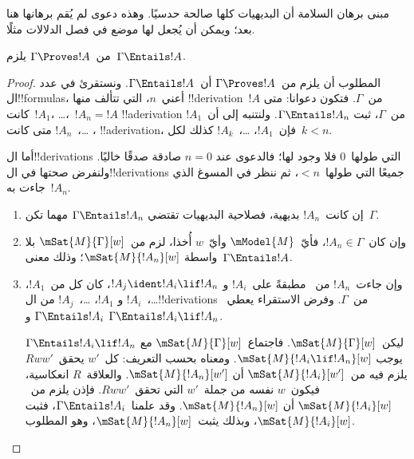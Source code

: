 \documentclass[../../../include/open-logic-section]{subfiles}
\begin{document}


\begin{editorial}
  مبنى برهان السلامة أن البديهيات كلها صالحة حدسيًا. وهذه دعوى لم يُقم
  برهانها هنا بعد؛ ويمكن أن يُجعل لها موضع في فصل الدلالات مثلًا.
\end{editorial}

\begin{thm}[السلامة]
  من~$\Gamma \Proves !A$ يلزم~$\Gamma \Entails !A$.
\end{thm}

\begin{proof}
  المطلوب أن يلزم من~$\Gamma \Proves !A$ أن~$\Gamma \Entails !A$.
  ونستقرئ في عدد ال!!{formula}s، أعني~$n$، التي تتألف منها
  !!{derivation}~$!A$ من~$\Gamma$. فتكون دعوانا: متى كانت~$!A_1$،
  \dots،~$!A_n=!A$ !!a{derivation} من~$\Gamma$، ثبت
  $\Gamma \Entails !A_n$. ولنتنبه إلى أن~$!A_1$، \dots،~$!A_n$
  متى كانت !!a{derivation}، فإن~$!A_1$، \dots،~$!A_k$ كذلك لكل~$k<n$.

  أما ال!!{derivation}s التي طولها~$0$ فلا وجود لها؛ فالدعوى عند
  $n=0$ صادقة صدقًا خاليًا. ولنفرض صحتها في ال!!{derivation}s جميعًا
  التي طولها~$<n$، ثم ننظر في المسوغ الذي جاءت به~$!A_n$.

  \begin{enumerate}
  \item إن كانت~$!A_n$ بديهية، فصلاحية البديهيات تقتضي
    $\Gamma \Entails !A_n$ مهما تكن~$\Gamma$.
  \item وإن كان~$!A_n \in \Gamma$، فأيّ~$\mModel{M}$ وأيّ~$w$ أُخذا،
    لزم من~$\mSat{M}{\Gamma}[w]$ بلا واسطة
    $\mSat{M}{!A_n}[w]$؛ وذلك معنى~$\Gamma \Entails !A$.
  \item وإن جاءت~$!A_n$ من~\MP{} مطبقةً على~$!A_i$ و
    $!A_j \ident !A_i \lif !A_n$، كان كل من~$!A_1$، \dots،~$!A_i$ و
    $!A_1$، \dots،~$!A_j$ من ال!!{derivation}s من~$\Gamma$. وفرض
    الاستقراء يعطي~$\Gamma \Entails !A_i$ و
    $\Gamma \Entails !A_i \lif !A_n$.

    ليكن~$\mSat{M}{\Gamma}[w]$. فاجتماع~$\mSat{M}{\Gamma}[w]$ مع
    $\Gamma \Entails !A_i \lif !A_n$ يوجب
    $\mSat{M}{!A_i \lif !A_n}[w]$. ومعناه بحسب التعريف: كل~$w'$
    يحقق~$Rww'$ يلزم فيه من~$\mSat{M}{!A_i}[w']$ أن
    $\mSat{M}{!A_n}[w']$. والعلاقة~$R$ انعكاسية، فيكون~$w$ نفسه من
    جملة~$w'$ التي تحقق~$Rww'$. فإذن يلزم من~$\mSat{M}{!A_i}[w]$ أن
    $\mSat{M}{!A_n}[w]$. وقد علمنا~$\Gamma \Entails !A_i$، فثبت
    $\mSat{M}{!A_i}[w]$، وبذلك يثبت~$\mSat{M}{!A_n}[w]$، وهو المطلوب.
  \end{enumerate}
\end{proof}
\end{document}
